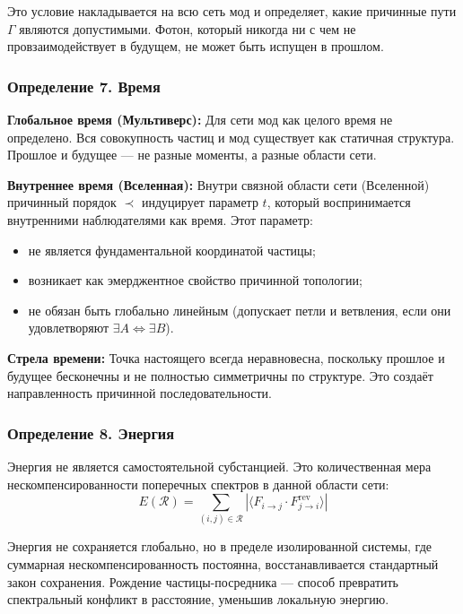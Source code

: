 \documentclass[12pt,a4paper]{article}
\begin{document}
Это условие накладывается на всю сеть мод и определяет, какие причинные пути $\Gamma$ являются допустимыми. Фотон, который никогда ни с чем не провзаимодействует в будущем, не может быть испущен в прошлом.

\subsubsection{Определение 7. Время}
\textbf{Глобальное время (Мультиверс):} Для сети мод как целого время не определено. Вся совокупность частиц и мод существует как статичная структура. Прошлое и будущее --- не разные моменты, а разные области сети.

\textbf{Внутреннее время (Вселенная):} Внутри связной области сети (Вселенной) причинный порядок $\prec$ индуцирует параметр $t$, который воспринимается внутренними наблюдателями как время. Этот параметр:
\begin{itemize}
    \item не является фундаментальной координатой частицы;
    \item возникает как эмерджентное свойство причинной топологии;
    \item не обязан быть глобально линейным (допускает петли и ветвления, если они удовлетворяют $\exists A \iff \exists B$).
\end{itemize}

\textbf{Стрела времени:} Точка настоящего всегда неравновесна, поскольку прошлое и будущее бесконечны и не полностью симметричны по структуре. Это создаёт направленность причинной последовательности.

\subsubsection{Определение 8. Энергия}
Энергия не является самостоятельной субстанцией. Это количественная мера нескомпенсированности поперечных спектров в данной области сети:
\begin{equation}
    E(\mathcal{R}) = \sum_{(i,j) \in \mathcal{R}} \left| \langle F_{i \to j} \cdot F_{j \to i}^{\text{rev}} \rangle \right|
\end{equation}

Энергия не сохраняется глобально, но в пределе изолированной системы, где суммарная нескомпенсированность постоянна, восстанавливается стандартный закон сохранения. Рождение частицы-посредника --- способ превратить спектральный конфликт в расстояние, уменьшив локальную энергию.
\end{document}

